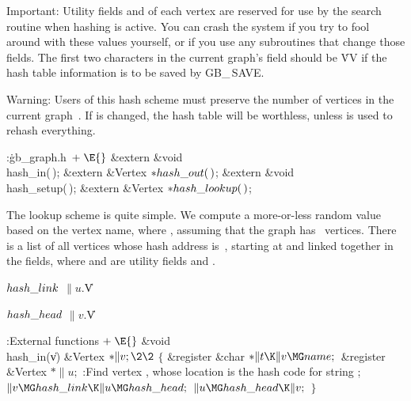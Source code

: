 Important: Utility fields  and  of each vertex are reserved for
use by
the search routine when hashing is active. You can crash the system
if you try to fool around with these values yourself, or if you use any
subroutines that change those fields. The first two characters in the
current graph's  field should be \.{VV} if the hash table
information is to be saved by {\sc GB\_\,SAVE}.

Warning: Users of this hash scheme must preserve the number of
vertices  in the current graph~. If  is
changed,
the hash table will be worthless, unless  is used to
rehash everything.

\Y\B\4:\.{gb\_graph.h\,}\X${}\mathrel+\E{}$\6
\&{extern} \&{void} \\{hash\_in}(\,);\6
\&{extern} \&{Vertex} ${}{*}\\{hash\_out}(\,){}$;\6
\&{extern} \&{void} \\{hash\_setup}(\,);\6
\&{extern} \&{Vertex} ${}{*}\\{hash\_lookup}(\,){}$;\par
\fi

The lookup scheme is quite simple. We compute a more-or-less random
value  based on the vertex name, where , assuming
that
the graph has ~vertices. There is a list of all vertices whose hash
address is~, starting at  and linked
together in the  fields, where  and  are
utility fields  and .

\Y\B\4\D$\\{hash\_link}$ \5
$\|u.{}$\|V\par
\B\4\D$\\{hash\_head}$ \5
$\|v.{}$\|V\par
\fi

\B{}:External functions\X${}\mathrel+\E{}$\6
\1\1\&{void} \\{hash\_in}(\|v)\6
\&{Vertex} ${}{*}\|v;\2\2{}$\6
${}\{{}$\5
\1\&{register} \&{char} ${}{*}\|t\K\|v\MG\\{name};{}$\6
\&{register} \&{Vertex} ${}{*}\|u;{}$\7
:Find vertex , whose location is the hash code for string %
\X;\6
${}\|v\MG\\{hash\_link}\K\|u\MG\\{hash\_head};{}$\6
${}\|u\MG\\{hash\_head}\K\|v;{}$\6
\4${}\}{}$\2\par
\fi

